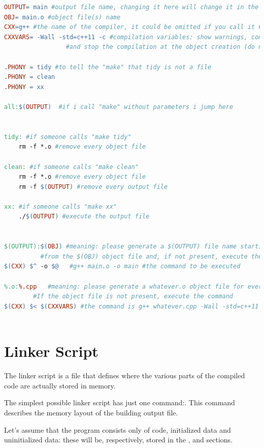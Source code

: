 \begin{lstlisting}[language=make, basicstyle=\ttfamily \scriptsize]
OUTPUT= main #output file name, changing it here will change it in the whole file
OBJ= main.o #object file(s) name 
CXX=g++	#the name of the compiler, it could be omitted if you call it CXX: its a standard variable
CXXVARS= -Wall -std=c++11 -c #compilation variables: show warnings, compile with c++11 
			     #and stop the compilation at the object creation (do not link the file)

.PHONY = tidy #to tell the "make" that tidy is not a file 
.PHONY = clean
.PHONY = xx

all:$(OUTPUT)  #if i call "make" without parameters i jump here


tidy: #if someone calls "make tidy"
	rm -f *.o #remove every object file

clean: #if someone calls "make clean"
	rm -f *.o #remove every object file
	rm -f $(OUTPUT) #remove every output file

xx: #if someone calls "make xx"
	./$(OUTPUT) #execute the output file


$(OUTPUT):$(OBJ) #meaning: please generate a $(OUTPUT) file name starting 
		  #from the $(OBJ) object file and, if not present, execute the command
$(CXX) $^ -o $@   #g++ main.o -o main #the command to be executed

%.o:%.cpp	#meaning: please generate a whatever.o object file for every whatever.cpp file. 
		#If the object file is not present, execute the command
$(CXX) $< $(CXXVARS) #the command is g++ whatever.cpp -Wall -std=c++11 -c



\end{lstlisting}



\section{Linker Script}
The linker script is a file that defines where the various parts of the compiled code are actually stored in memory.

The simplest possible linker script has just one command:\code[SECTIONS]. This command describes the memory layout of the building output file.

Let's assume that the program consists only of code, initialized data and uninitialized data: these will be, respectively, stored in the ,  and  sections.

